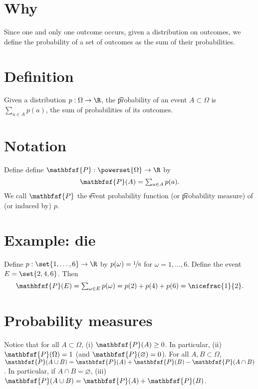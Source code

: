 
\section{Why}

Since one and only one outcome occurs, given a distribution on outcomes, we define the probability of a set of outcomes as the sum of their probabilities.

\section{Definition}

Given a distribution $p: \Omega  \to \R $, the \t{probability of an event} $A \subset \Omega $ is $\sum_{a \in A} p(a)$, the sum of probabilities of its outcomes.

\section{Notation}

Define define $\mathbfsf{P} : \powerset{\Omega } \to \R $ by
  \[
\textstyle
\mathbfsf{P} (A) = \sum_{a \in A} p(a).
  \]
We call $\mathbfsf{P} $ the \t{event probability function} (or \t{probability measure}) of (or induced by) $p$.

\section{Example: die}

Define $p: \set{1, \dots , 6} \to \R $ by $p(\omega ) = \nicefrac{1}{6}$ for $\omega  = 1, \dots , 6$.
Define the event $E = \set{2, 4, 6}$.
Then
  \[
\textstyle
\mathbfsf{P} (E) = \sum_{\omega  \in E} p(\omega ) = p(2) + p(4) + p(6) = \nicefrac{1}{2}.
  \]

\section{Probability measures}

Notice that for all $A \subset \Omega $, (i) $\mathbfsf{P} (A) \geq 0$.
In particular, (ii) $\mathbfsf{P} (\Omega ) = 1$ (and $\mathbfsf{P} (\varnothing) = 0$).
For all $A, B \subset \Omega $, $\mathbfsf{P} (A \cup B) = \mathbfsf{P} (A) + \mathbfsf{P} (B) - \mathbfsf{P} (A \cap B)$.
In particular, if $A \cap B = \varnothing$, (iii) $\mathbfsf{P} (A \cup B) = \mathbfsf{P} (A) + \mathbfsf{P} (B)$.

